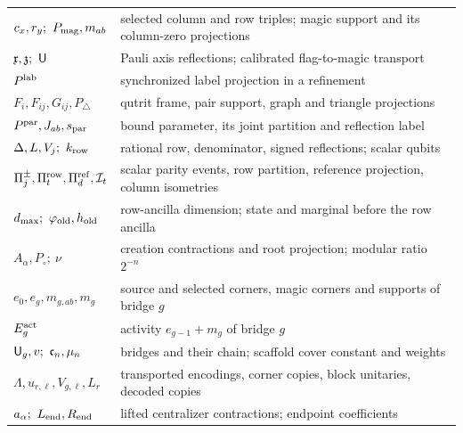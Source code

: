 \begin{center}
\begin{tabular}{@{}>{\raggedright\arraybackslash}p{.33\linewidth}>{\raggedright\arraybackslash}p{.60\linewidth}@{}}
$c_x,r_y;\ P_{\rm mag},m_{ab}$ & selected column and row triples; magic support and its column-zero projections\\
$\mathfrak x,\mathfrak z;\ \mathsf U$ & Pauli axis reflections; calibrated flag-to-magic transport\\
$P^{\rm lab}$ & synchronized label projection in a refinement\\
$F_i,F_{ij},G_{ij},P_\triangle$ & qutrit frame, pair support, graph and triangle projections\\
$P^{\rm par},J_{ab},s_{\rm par}$ & bound parameter, its joint partition and reflection label\\
$\Delta,L,V_j;\ k_{\rm row}$ & rational row, denominator, signed reflections; scalar qubits\\
$\Pi^\pm_j,\Pi^{\rm row}_t,\Pi^{\rm ref}_d,\mathcal I_t$ & scalar parity events, row partition, reference projection, column isometries\\
$d_{\max};\ \varphi_{\rm old},h_{\rm old}$ & row-ancilla dimension; state and marginal before the row ancilla\\
$A_\alpha,P_\circ;\ \nu$ & creation contractions and root projection; modular ratio $2^{-n}$\\
$e_0,e_g,m_{g,ab},m_g$ & source and selected corners, magic corners and supports of bridge $g$\\
$E^{\rm act}_g$ & activity $e_{g-1}+m_g$ of bridge $g$\\
$\btrans_g,v;\ \mathfrak c_n,\mu_n$ & bridges and their chain; scaffold cover constant and weights\\
$\Lambda,u_{r,\ell},V_{g,\ell},L_r$ & transported encodings, corner copies, block unitaries, decoded copies\\
$a_\alpha;\ L_{\rm end},R_{\rm end}$ & lifted centralizer contractions; endpoint coefficients\\
\bottomrule\end{tabular}\end{center}
\newpage
